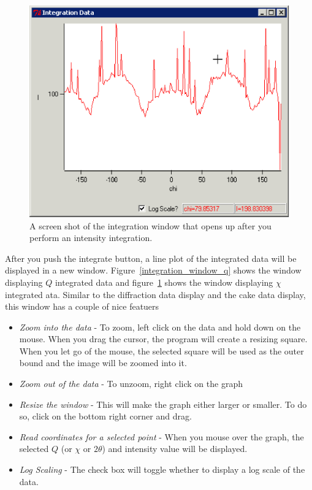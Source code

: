 \begin{figure}
\centering
\includegraphics[scale=.75]{figures/integration_window_chi.eps}
\caption{A screen shot of the integration window that
    opens up after you perform an intensity integration.} 
\label{integration_window_chi}
\end{figure}

After you push the integrate button, a line plot of the 
integrated data will be displayed in a new window. 
Figure~\ref{integration_window_q} shows 
the window displaying $Q$ integrated data
and figure~\ref{integration_window_chi} shows the
window displaying $\chi$ integrated ata.
Similar to the diffraction data display and the cake 
data display, this window has a couple of nice featuers
\begin{itemize}
    \item {\em Zoom into the data} - To zoom, left click
    on the data and hold down on the mouse. When you drag 
    the cursor, the program will create a resizing square. 
    When you let go of the mouse, the selected square will 
    be used as the outer bound and the image will be zoomed 
    into it. 
    \item {\em Zoom out of the data} - To unzoom, right
    click on the graph
    \item {\em Resize the window} - This will make the graph
    either larger or smaller. To do so, click on the bottom 
    right corner and drag. 
    \item {\em Read coordinates for a selected point} -
    When you mouse over the graph, the selected $Q$ (or $\chi$
    or $2\theta$) and intensity value will be displayed.
    \item {\em Log Scaling} - The  check box
    will toggle whether to display a log scale of the data.
\end{itemize}

